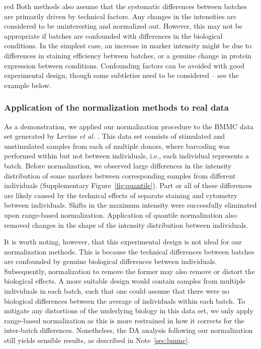 \documentclass{article}
\begin{document}
\begin{color}{red}
Both methods also assume that the systematic differences between batches are primarily driven by technical factors.
Any changes in the intensities are considered to be uninteresting and normalized out.
However, this may not be appropriate if batches are confounded with differences in the biological conditions.
In the simplest case, an increase in marker intensity might be due to differences in staining efficiency between batches, or a genuine change in protein expression between conditions.
Confounding factors can be avoided with good experimental design, though some subtleties need to be considered -- see the example below.
\end{color}

\subsubsection{Application of the normalization methods to real data}
As a demonstration, we applied our normalization procedure to the BMMC data set generated by Levine \textit{et al.} \cite{levine2015datadriven}.
This data set consists of stimulated and unstimulated samples from each of multiple donors, where barcoding was performed within but not between individuals, i.e., each individual represents a batch.
Before normalization, we observed large differences in the intensity distribution of some markers between corresponding samples from different individuals (Supplementary Figure~\ref{fig:quantile}).
Part or all of these differences are likely caused by the technical effects of separate staining and cytometry between individuals.
Shifts in the maximum intensity were successfully eliminated upon range-based normalization.
Application of quantile normalization also removed changes in the shape of the intensity distribution between individuals.

It is worth noting, however, that this experimental design is not ideal for our normalization methods.
This is because the technical differences between batches are confounded by genuine biological differences between individuals.
Subsequently, normalization to remove the former may also remove or distort the biological effects.
A more suitable design would contain samples from multiple individuals in each batch, such that one could assume that there were no biological differences between the average of individuals within each batch.
To mitigate any distortions of the underlying biology in this data set, we only apply range-based normalization as this is more restrained in how it corrects for the inter-batch differences.
Nonetheless, the DA analysis following our normalization still yields sensible results, as described in Note~\ref{sec:bmmc}.
\end{document}
